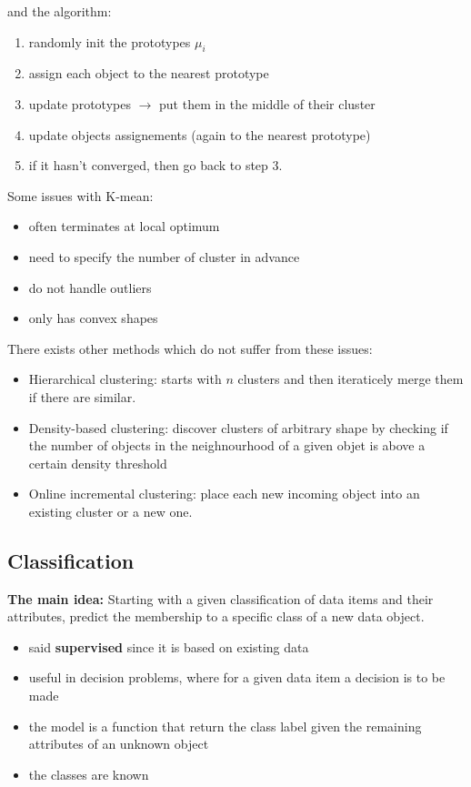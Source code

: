 and the algorithm:

\noindent

\begin{enumerate}
	\item randomly init the prototypes $\mu_i$
	\item assign each object to the nearest prototype
	\item update prototypes $\rightarrow$ put them in the middle of their cluster
	\item update objects assignements (again to the nearest prototype)
	\item if it hasn't converged, then go back to step 3.
\end{enumerate}
Some issues with K-mean:
\begin{itemize}
	\item often terminates at local optimum
	\item need to specify the number of cluster in advance
	\item do not handle outliers
	\item only has convex shapes
\end{itemize}
There exists other methods which do not suffer from these issues:
\begin{itemize}
	\item Hierarchical clustering: starts with $n$ clusters and then iteraticely merge them if there are similar.

	\item Density-based clustering: discover clusters of arbitrary shape by checking if the number of objects in the neighnourhood of a given objet is above a certain density threshold

	\item Online incremental clustering: place each new incoming object into an existing cluster or a new one.
\end{itemize}


\subsection{Classification}
\textbf{The main idea:} Starting with a given classification of data items and their attributes, predict the membership to a specific class of a new data object.

\begin{itemize}
	\item said \textbf{supervised} since it is based on existing data
	\item useful in decision problems, where for a given data item a decision is to be made
	\item the model is a function that return the class label given the remaining attributes of an unknown object
	\item the classes are known
\end{itemize}

